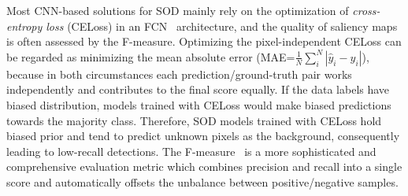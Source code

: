 \documentclass[10pt,twocolumn,letterpaper]{article}
\begin{document}
Most CNN-based solutions for SOD
\cite{hou2017deeply,li2016deep,wang2016saliency,fan2019shifting,wang2019iterative,
zhao2019EGNet,wang2019salient}
mainly rely on the optimization of
\emph{cross-entropy loss} (CELoss) in an FCN~\cite{long2015fully} architecture,
and the quality of saliency maps is often assessed by the F-measure.
%
Optimizing the pixel-independent CELoss can be regarded as minimizing the mean absolute
error (MAE=$\frac{1}{N}\sum_i^N |\hat{y}_i - y_i|$), because in both circumstances
each prediction/ground-truth pair works independently and contributes
to the final score equally.
%
If the data labels have biased distribution, models trained with CELoss
would make biased predictions towards the majority class.
%
Therefore, SOD models trained with CELoss hold biased prior and tend to
predict unknown pixels as the background,
consequently leading to low-recall detections.
%
%
The F-measure~\cite{van1974foundation} is a more sophisticated
and comprehensive evaluation metric which combines
precision and recall into a single score
and automatically offsets the unbalance between positive/negative samples.
\end{document}
